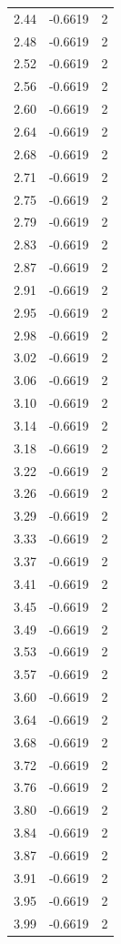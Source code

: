 \begin{longtable}{lrr}
  2.44 & -0.6619 & 2 \\
  2.48 & -0.6619 & 2 \\
  2.52 & -0.6619 & 2 \\
  2.56 & -0.6619 & 2 \\
  2.60 & -0.6619 & 2 \\
  2.64 & -0.6619 & 2 \\
  2.68 & -0.6619 & 2 \\
  2.71 & -0.6619 & 2 \\
  2.75 & -0.6619 & 2 \\
  2.79 & -0.6619 & 2 \\
  2.83 & -0.6619 & 2 \\
  2.87 & -0.6619 & 2 \\
  2.91 & -0.6619 & 2 \\
  2.95 & -0.6619 & 2 \\
  2.98 & -0.6619 & 2 \\
  3.02 & -0.6619 & 2 \\
  3.06 & -0.6619 & 2 \\
  3.10 & -0.6619 & 2 \\
  3.14 & -0.6619 & 2 \\
  3.18 & -0.6619 & 2 \\
  3.22 & -0.6619 & 2 \\
  3.26 & -0.6619 & 2 \\
  3.29 & -0.6619 & 2 \\
  3.33 & -0.6619 & 2 \\
  3.37 & -0.6619 & 2 \\
  3.41 & -0.6619 & 2 \\
  3.45 & -0.6619 & 2 \\
  3.49 & -0.6619 & 2 \\
  3.53 & -0.6619 & 2 \\
  3.57 & -0.6619 & 2 \\
  3.60 & -0.6619 & 2 \\
  3.64 & -0.6619 & 2 \\
  3.68 & -0.6619 & 2 \\
  3.72 & -0.6619 & 2 \\
  3.76 & -0.6619 & 2 \\
  3.80 & -0.6619 & 2 \\
  3.84 & -0.6619 & 2 \\
  3.87 & -0.6619 & 2 \\
  3.91 & -0.6619 & 2 \\
  3.95 & -0.6619 & 2 \\
  3.99 & -0.6619 & 2 \\

\end{longtable}
